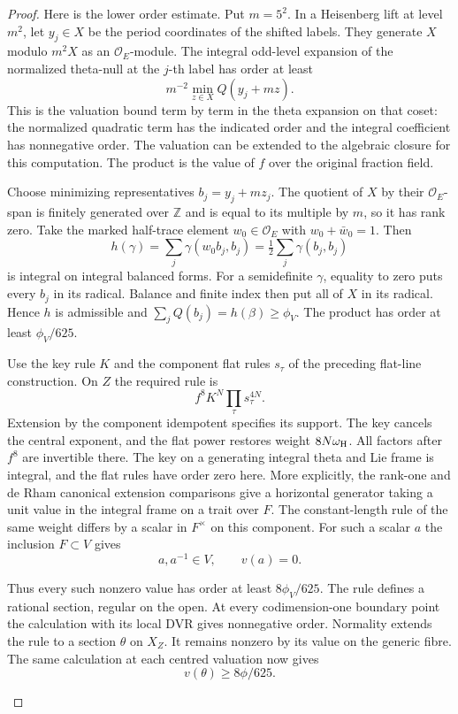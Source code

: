 \begin{proof}
Here is the lower order estimate. Put \(m=5^2\). In a
Heisenberg lift at level \(m^2\), let \(y_j\in X\) be
the period coordinates of the shifted labels. They generate
\(X\) modulo \(m^2X\) as an \(\mathcal O_E\)-module.
The integral odd-level expansion of the normalized
theta-null at the \(j\)-th label has order at least
\[
             m^{-2}\min_{z\in X}Q(y_j+mz).
\]
This is the valuation bound term by term in the theta
expansion on that coset: the normalized quadratic term
has the indicated order and the integral coefficient has
nonnegative order. The valuation can be extended to the
algebraic closure for this computation. The product is
the value of \(f\) over the original fraction field.

Choose minimizing representatives \(b_j=y_j+m z_j\).
The quotient of \(X\) by their \(\mathcal O_E\)-span
is finitely generated over \(\mathbb Z\) and is equal
to its multiple by \(m\), so it has rank zero. Take the
marked half-trace element \(w_0\in\mathcal O_E\) with
\(w_0+\bar w_0=1\). Then
\[
 h(\gamma)=\sum_j\gamma(w_0 b_j,b_j)
          =\tfrac12\sum_j\gamma(b_j,b_j)
\]
is integral on integral balanced forms. For a semidefinite
\(\gamma\), equality to zero puts every \(b_j\) in its
radical. Balance and finite index then put all of \(X\)
in its radical. Hence \(h\) is admissible and
\(\sum_j Q(b_j)=h(\beta)\ge\phi_V\). The product has
order at least \(\phi_V/625\).

Use the key rule \(K\) and the component flat rules
\(s_\tau\) of the preceding flat-line construction. On
\(Z\) the required rule is
\[
        f^8 K^N \prod_\tau s_\tau^{4N}.
\]
Extension by the component idempotent specifies its support.
The key cancels the central exponent, and the flat power
restores weight \(8N\omega_{\rm H}\). All factors after
\(f^8\) are invertible there. The key on a generating
integral theta and Lie frame is integral, and the flat rules have order zero here. More explicitly,
the rank-one and de Rham canonical extension comparisons
give a horizontal generator taking a unit value in the
integral frame on a trait over \(F\). The constant-length
rule of the same weight differs by a scalar in \(F^\times\)
on this component. For such a scalar \(a\) the inclusion \(F\subset V\) gives
\[
 a,a^{-1}\in V,\qquad v(a)=0.
\]

Thus every such nonzero value has order at least
\(8\phi_V/625\). The rule defines a rational section,
regular on the open. At every codimension-one boundary
point the calculation with its local DVR gives nonnegative
order. Normality extends the rule to a section \(\theta\)
on \(X_Z\). It remains nonzero by its value on the generic fibre.
The same calculation at each centred valuation now gives
\[
 v(\theta)\ge 8\phi/625.
\]

\label{cor:deep-boundary-orders-4}

\end{proof}

